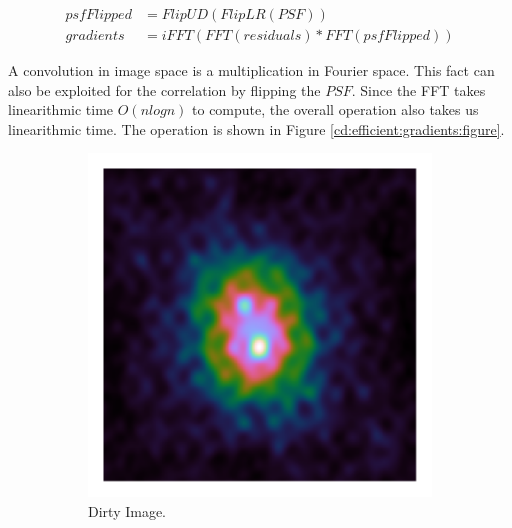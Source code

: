 \begin{equation}\label{cd:efficient:gradients:correlation}
\begin{split}
psfFlipped &= FlipUD(FlipLR(PSF)) \\
gradients &= iFFT(FFT(residuals) * FFT(psfFlipped))
\end{split}
\end{equation}

A convolution in image space is a multiplication in Fourier space. This fact can also be exploited for the correlation by flipping the $PSF$. Since the FFT takes linearithmic time $O(n log n)$ to compute, the overall operation also takes us linearithmic time. The operation is shown in Figure \ref{cd:efficient:gradients:figure}.

\begin{figure}[h]
	\centering
	\begin{subfigure}[b]{0.3\linewidth}
		\includegraphics[width=\linewidth, clip, trim= 0.125in 0.125in 0.125in 0.125in]{./chapters/03.cd/simulated/dirty.png}
		\caption{Dirty Image.}
		\label{cd:efficient:gradients:dirty}
	\end{subfigure}
	\begin{subfigure}[b]{0.3\linewidth}

\end{subfigure}
\end{figure}

